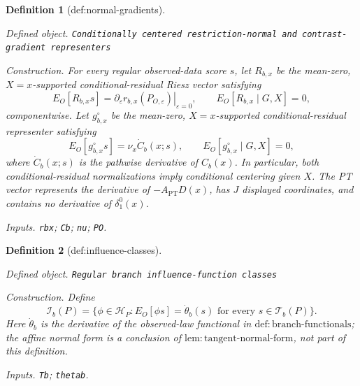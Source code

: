 \documentclass{article}
\newtheorem{definition}{Definition}
\begin{document}
\begin{definition}[def:normal-gradients]\label{def:normal-gradients}
\par\smallskip\noindent\emph{Defined object.} \texttt{Conditionally centered restriction-\allowbreak{}normal and contrast-\allowbreak{}gradient representers}
\par\smallskip\noindent\emph{Construction.} For every regular observed-data score \(s\), let \(R_{b,x}\) be the mean-zero, \(X=x\)-supported conditional-residual Riesz vector satisfying
\[
 E_O[R_{b,x}s]
 =\left.\partial_{\varepsilon}r_{b,x}(P_{O,\varepsilon})\right|_{\varepsilon=0},
 \qquad E_O[R_{b,x}\mid G,X]=0,
\]
componentwise. Let \(g^{\circ}_{b,x}\) be the mean-zero, \(X=x\)-supported conditional-residual representer satisfying
\[
 E_O[g^{\circ}_{b,x}s]=\nu_x\dot C_b(x;s),
 \qquad E_O[g^{\circ}_{b,x}\mid G,X]=0,
\]
where \(\dot C_b(x;s)\) is the pathwise derivative of \(C_b(x)\). In particular, both conditional-residual normalizations imply conditional centering given \(X\). The PT vector represents the derivative of \(-A_{\mathrm{PT}}D(x)\), has \(J\) displayed coordinates, and contains no derivative of \(\delta_1^0(x)\).
\par\smallskip\noindent\emph{Inputs.} \texttt{rbx}; \texttt{Cb}; \texttt{nu}; \texttt{PO}.
\end{definition}

\begin{definition}[def:influence-classes]\label{def:influence-classes}
\par\smallskip\noindent\emph{Defined object.} \texttt{Regular branch influence-\allowbreak{}function classes}
\par\smallskip\noindent\emph{Construction.} Define
\[
 \mathcal I_b(P)=\{\phi\in\mathcal H_P:E_O[\phi s]=\dot\theta_b(s)
 \text{ for every }s\in\mathcal T_b(P)\}.
\]
Here \(\dot\theta_b\) is the derivative of the observed-law functional in \(\mathrm{def{:}branch\text{-}functionals}\); the affine normal form is a conclusion of \(\mathrm{lem{:}tangent\text{-}normal\text{-}form}\), not part of this definition.
\par\smallskip\noindent\emph{Inputs.} \texttt{Tb}; \texttt{thetab}.
\end{definition}
\end{document}
